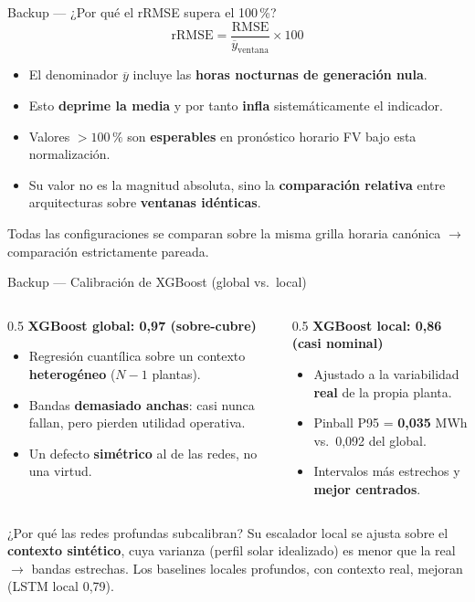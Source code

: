 \documentclass[10pt,aspectratio=169]{beamer}
\newcommand{\rj}[1]{\textcolor{alertred}{\textbf{#1}}}
\begin{document}
\begin{frame}{Backup --- ¿Por qué el rRMSE supera el 100\,\%?}
  \[
    \mathrm{rRMSE} = \frac{\mathrm{RMSE}}{\overline{y}_{\text{ventana}}}\times 100
  \]
  \begin{itemize}
    \item El denominador $\overline{y}$ incluye las \textbf{horas nocturnas de generación nula}.
    \item Esto \textbf{deprime la media} y por tanto \textbf{infla} sistemáticamente el indicador.
    \item Valores $>100\,\%$ son \textbf{esperables} en pronóstico horario FV bajo esta normalización.
    \item Su valor no es la magnitud absoluta, sino la \rj{comparación relativa} entre arquitecturas sobre \textbf{ventanas idénticas}.
  \end{itemize}
  \vspace{0.3em}
  \centering\footnotesize
  Todas las configuraciones se comparan sobre la misma grilla horaria canónica $\rightarrow$ comparación estrictamente pareada.
\end{frame}

\begin{frame}{Backup --- Calibración de XGBoost (global vs.\ local)}
  \begin{columns}[T]
    \begin{column}{0.5\textwidth}
      \textbf{XGBoost global: 0,97 (sobre-cubre)}
      \begin{itemize}
        \item Regresión cuantílica sobre un contexto \textbf{heterogéneo} ($N-1$ plantas).
        \item Bandas \textbf{demasiado anchas}: casi nunca fallan, pero pierden utilidad operativa.
        \item Un defecto \textbf{simétrico} al de las redes, no una virtud.
      \end{itemize}
    \end{column}
    \begin{column}{0.5\textwidth}
      \textbf{XGBoost local: 0,86 (casi nominal)}
      \begin{itemize}
        \item Ajustado a la variabilidad \textbf{real} de la propia planta.
        \item Pinball P95 = \textbf{0,035} MWh vs.\ 0,092 del global.
        \item Intervalos más estrechos y \textbf{mejor centrados}.
      \end{itemize}
    \end{column}
  \end{columns}
  \vspace{0.5em}
  \begin{alertblock}{¿Por qué las redes profundas subcalibran?}
    Su escalador local se ajusta sobre el \textbf{contexto sintético}, cuya varianza (perfil solar idealizado) es menor que la real $\rightarrow$ bandas estrechas. Los baselines locales profundos, con contexto real, mejoran (LSTM local 0,79).
  \end{alertblock}
\end{frame}
\end{document}
